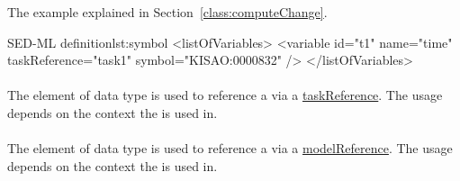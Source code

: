
The example  explained in Section~\ref{class:computeChange}.

\begin{myXmlLst}{SED-ML  definition}{lst:symbol}
<listOfVariables>
	<variable id="t1" name="time" taskReference="task1" symbol="KISAO:0000832" />
</listOfVariables>
\end{myXmlLst}

\paragraph*{}
\label{sec:taskReferenceAttribute}
The  element of data type \SIdRef is used to reference a \Task via a \hyperref[sec:taskReference]{taskReference}. The usage depends on the context the \Variable is used in.

\paragraph*{}
\label{sec:modelReferenceAttribute}
The  element of data type \SIdRef is used to reference a \Model via a \hyperref[sec:modelReference]{modelReference}. The usage depends on the context the \Variable is used in.


